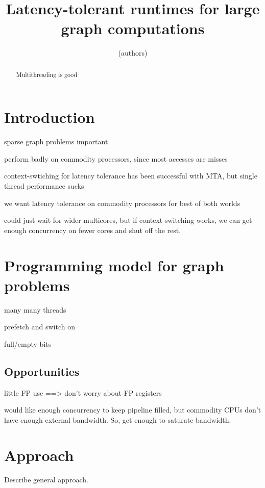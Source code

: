 \documentclass{acm_proc_article-sp}
\begin{document}
\title{Latency-tolerant runtimes for large graph computations}

\author{
(authors)
}

\maketitle
\begin{abstract}
Multithreading is good
\end{abstract}

\section{Introduction}

sparse graph problems important

perform badly on commodity processors, since most accesses are misses

context-swtiching for latency tolerance has been successful with MTA, but single thread performance sucks

we want latency tolerance on commodity processors for best of both worlds

could just wait for wider multicores, but if context switching works, we can get enough concurrency on fewer cores and shut off the rest.

\section{Programming model for graph problems}

many many threads

prefetch and switch on 

full/empty bits 

\subsection{Opportunities}

little FP use ==> don't worry about FP registers

would like enough concurrency to keep pipeline filled, but commodity CPUs don't have enough external bandwidth. So, get enough to saturate bandwidth.



\section{Approach}

Describe general approach.
\end{document}
